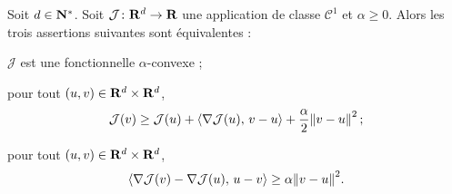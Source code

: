\documentclass[grape]{../ceri/sty/MasterNotes}
\newcommand\J{\mathcal J}
\begin{document}
\begin{propo}\label{prp:1.6.6}
    Soit $d\in\mathbf{N}^*$. Soit $\J\colon\R^d\to\R$ une application de classe $\mathcal C^1$ et $\alpha\ge 0$. Alors les trois assertions suivantes sont équivalentes :
    \begin{subth}
        \item\label{prp:1.6.6i} $\J$ est une fonctionnelle $\alpha$-convexe ;
        \item\label{prp:1.6.6ii} pour tout $(u,v)\in\mathbf{R}^d\times\mathbf{R}^d$,
        \[ \J(v)\ge\J(u) + \ps{\nabla\J(u)}{v-u} + \frac\alpha 2\norme{v-u}^2\,; \]
        \item\label{prp:1.6.6iii} pour tout $(u,v)\in\mathbf{R}^d\times\mathbf{R}^d$,
        \[ \ps{\nabla\J(v)-\nabla\J(u)}{u-v}\ge\alpha\norme{v-u}^2. \]
    \end{subth}
\end{propo}
\end{document}
